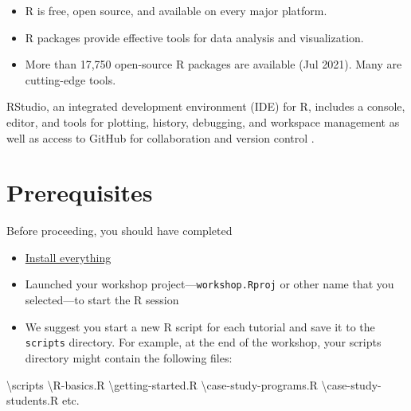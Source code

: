 \documentclass[
]{book}
\newenvironment{Shaded}{\begin{snugshade}}{\end{snugshade}}
\newcommand{\NormalTok}[1]{#1}
\newcommand{\SpecialCharTok}[1]{\textcolor[rgb]{0.00,0.00,0.00}{#1}}
\providecommand{\tightlist}{%
  \setlength{\itemsep}{0pt}\setlength{\parskip}{0pt}}
\begin{document}
\begin{itemize}
\tightlist
\item
  R is free, open source, and available on every major platform.
\item
  R packages provide effective tools for data analysis and visualization.
\item
  More than 17,750 open-source R packages are available (Jul 2021). Many are cutting-edge tools.
\end{itemize}

RStudio, an integrated development environment (IDE) for R, includes a console, editor, and tools for plotting, history, debugging, and workspace management as well as access to GitHub for collaboration and version control \citep{2016rstudio}.

\hypertarget{prerequisites}{%
\section{Prerequisites}\label{prerequisites}}

Before proceeding, you should have completed

\begin{itemize}
\tightlist
\item
  \protect\hyperlink{install-everything}{Install everything}\\
\item
  Launched your workshop project---\texttt{workshop.Rproj} or other name that you selected---to start the R session\\
\item
  We suggest you start a new R script for each tutorial and save it to the \texttt{scripts} directory. For example, at the end of the workshop, your scripts directory might contain the following files:
\end{itemize}

\begin{Shaded}
\begin{Highlighting}[]
\NormalTok{        \textbackslash{}scripts    }
\NormalTok{            \textbackslash{}R}\SpecialCharTok{{-}}\NormalTok{basics.R    }
\NormalTok{            \textbackslash{}getting}\SpecialCharTok{{-}}\NormalTok{started.R    }
\NormalTok{            \textbackslash{}case}\SpecialCharTok{{-}}\NormalTok{study}\SpecialCharTok{{-}}\NormalTok{programs.R    }
\NormalTok{            \textbackslash{}case}\SpecialCharTok{{-}}\NormalTok{study}\SpecialCharTok{{-}}\NormalTok{students.R     }
\NormalTok{            etc.  }
\end{Highlighting}
\end{Shaded}
\end{document}
